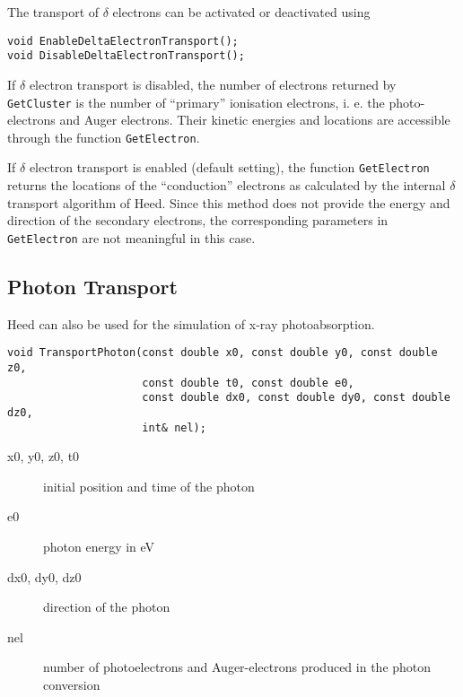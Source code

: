 The transport of \(\delta\) electrons can be activated or deactivated 
using
\begin{lstlisting}
void EnableDeltaElectronTransport();
void DisableDeltaElectronTransport();
\end{lstlisting} 

If \(\delta\) electron transport is disabled, 
the number of electrons returned by \texttt{GetCluster} is 
the number of ``primary'' ionisation electrons, 
i. e. the photo-electrons and Auger electrons. 
Their kinetic energies and locations are accessible 
through the function \texttt{GetElectron}.

If \(\delta\) electron transport is enabled (default setting), 
the function \texttt{GetElectron} returns the 
locations of the ``conduction'' electrons as calculated by the 
internal \(\delta\) transport algorithm of Heed. 
Since this method does not provide the energy and direction of the 
secondary electrons, the corresponding parameters in 
\texttt{GetElectron} are not meaningful in this case. 

\subsection{Photon Transport}

Heed can also be used for the simulation of x-ray photoabsorption. 
\begin{lstlisting}
void TransportPhoton(const double x0, const double y0, const double z0,
                     const double t0, const double e0,
                     const double dx0, const double dy0, const double dz0,
                     int& nel);
\end{lstlisting}
\begin{description}
\item[x0, y0, z0, t0] initial position and time of the photon
\item[e0] photon energy in eV
\item[dx0, dy0, dz0] direction of the photon
\item[nel] number of photoelectrons and Auger-electrons produced 
           in the photon conversion
\end{description}

